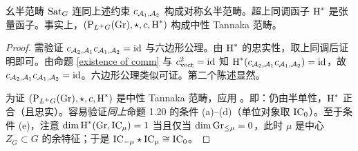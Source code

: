 \begin{thm}\label{Tannakian structure}
幺半范畴 $\Sat_G$ 连同上述约束 $c_{\mA_1,\mA_2}$ 构成对称幺半范畴。超上同调函子 $\on{H}^*$ 是张量函子。事实上，$(\on{P}_{L^+G}(\Gr),\star,c,\on{H}^*)$ 构成中性 Tannaka 范畴。
\end{thm}

\begin{proof}
需验证 $c_{\mA_2,\mA_1}c_{\mA_1,\mA_2}=\id$ 与六边形公理。由 $\on{H}^*$ 的忠实性，取上同调后证明即可。由命题 \ref{existence of comm} 与 $c_{\on{vect}}^2=\id$ 知 $\on{H}^*(c_{\mA_2,\mA_1}c_{\mA_1,\mA_2})=\id$，故 $c_{\mA_2,\mA_1}c_{\mA_1,\mA_2}=\id$。六边形公理类似可证。第二个陈述显然。

为证 $(\on{P}_{L^+G}(\Gr),\star,c,\on{H}^*)$ 是中性 Tannaka 范畴，应用 \cite[Proposition 1.20, Remark 2.18]{DM}。即：仍由半单性，$\on{H}^*$ 正合（且忠实）。容易验证\emph{同上}命题 1.20 的条件 (a)--(d)（单位对象取 $\IC_0$）。至于条件 (e)，注意 $\dim \on{H}^*(\Gr,\IC_\mu)=1$ 当且仅当 $\dim \Gr_{\leq \mu}=0$，此时 $\mu$ 是中心 $Z_G\subset G$ 的余特征；于是 $\IC_{-\mu}\star\IC_\mu\cong \IC_0$。
\end{proof}
